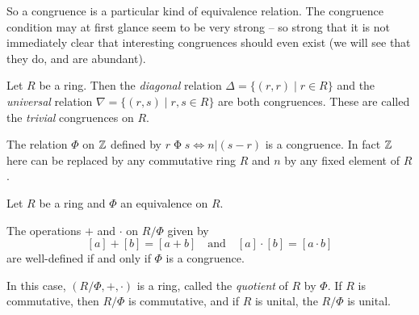 So a congruence is a particular kind of equivalence relation. The congruence condition may at first glance seem to be very strong -- so strong that it is not immediately clear that interesting congruences should even exist (we will see that they do, and are abundant).

\begin{examples}
\item Let \(R\) be a ring. Then the \emph{diagonal} relation \(\Delta = \{ (r,r) \mid r \in R \}\) and the \emph{universal} relation \(\nabla = \{ (r,s) \mid r,s \in R \}\) are both congruences. These are called the \emph{trivial} congruences on \(R\).

\item The relation \(\Phi\) on \(\mathbb{Z}\) defined by \(r \mathrel{\Phi} s \Leftrightarrow n|(s-r)\) is a congruence. In fact \(\mathbb{Z}\) here can be replaced by any commutative ring \(R\) and \(n\) by any fixed element of \(R\).
\end{examples}

\begin{prop}
Let \(R\) be a ring and \(\Phi\) an equivalence on \(R\).
\begin{proplist}
\item The operations \(+\) and \(\cdot\) on \(R/\Phi\) given by \[ [a] + [b] = [a+b] \quad \mathrm{and} \quad [a] \cdot [b] = [a \cdot b] \] are well-defined if and only if \(\Phi\) is a congruence.
\item In this case, \((R/\Phi, +, \cdot)\) is a ring, called the \emph{quotient} of \(R\) by \(\Phi\). If \(R\) is commutative, then \(R/\Phi\) is commutative, and if \(R\) is unital, the \(R/\Phi\) is unital.
\end{proplist}
\end{prop}


